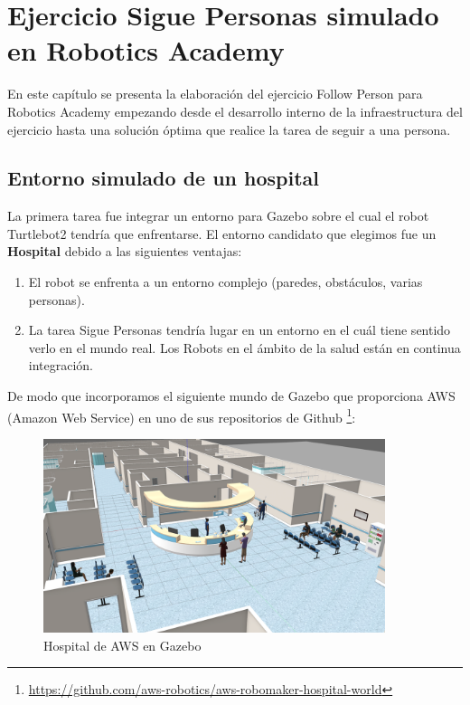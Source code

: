 \chapter{Ejercicio Sigue Personas simulado en Robotics Academy}
\label{cap:capitulo5}

En este capítulo se presenta la elaboración del ejercicio Follow Person para Robotics Academy empezando desde el desarrollo interno de la infraestructura del ejercicio hasta una solución óptima que realice la tarea de seguir a una persona.



\section{Entorno simulado de un hospital}
\label{sec:hospital_gazebo}

La primera tarea fue integrar un entorno para Gazebo sobre el cual el robot Turtlebot2 tendría que enfrentarse. El entorno candidato que elegimos fue un \textbf{Hospital} debido a las siguientes ventajas:

\begin{enumerate}
	\item El robot se enfrenta a un entorno complejo (paredes, obstáculos, varias personas).
	\item La tarea Sigue Personas tendría lugar en un entorno en el cuál tiene sentido verlo en el mundo real. Los Robots en el ámbito de la salud están en continua integración.
\end{enumerate}

De modo que incorporamos el siguiente mundo de Gazebo que proporciona AWS (Amazon Web Service) en uno de sus repositorios de Github \footnote{\url{https://github.com/aws-robotics/aws-robomaker-hospital-world}}:

\begin{figure} [H]
  \begin{center}
    \includegraphics[width=10cm]{imagenes/hospital_world.png}
  \end{center}
  \caption[Hospital de AWS en Gazebo]{Hospital de AWS en Gazebo}
  \label{fig:hospital_gazebo}
\end{figure}

